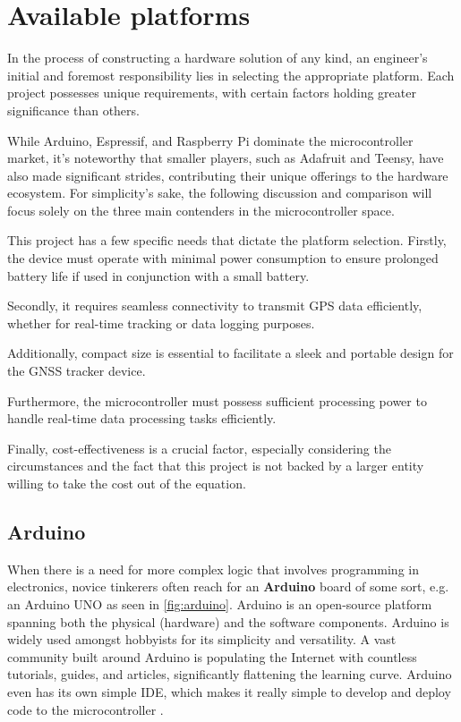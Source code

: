 \documentclass[FM,BP,EN,fonts]{tulthesis}
\begin{document}
\section{Available platforms}
\label{sec:platforms}
In the process of constructing a hardware solution of any kind, an engineer's initial and foremost responsibility lies in selecting the appropriate platform. Each project possesses unique requirements, with certain factors holding greater significance than others. 

While Arduino, Espressif, and Raspberry Pi dominate the microcontroller market, it's noteworthy that smaller players, such as Adafruit and Teensy, have also made significant strides, contributing their unique offerings to the hardware ecosystem. For simplicity's sake, the following discussion and comparison will focus solely on the three main contenders in the microcontroller space.

This project has a few specific needs that dictate the platform selection. Firstly, the device must operate with minimal power consumption to ensure prolonged battery life if used in conjunction with a small battery. 

Secondly, it requires seamless connectivity to transmit GPS data efficiently, whether for real-time tracking or data logging purposes. 

Additionally, compact size is essential to facilitate a sleek and portable design for the GNSS tracker device. 

Furthermore, the microcontroller must possess sufficient processing power to handle real-time data processing tasks efficiently. 

Finally, cost-effectiveness is a crucial factor, especially considering the circumstances and the fact that this project is not backed by a larger entity willing to take the cost out of the equation.

\subsection{Arduino}
When there is a need for more complex logic that involves programming in electronics, novice tinkerers often reach for an \textbf{Arduino} board of some sort, e.g. an Arduino UNO as seen in \autoref{fig:arduino}. Arduino is an open-source platform spanning both the physical (hardware) and the software components. Arduino is widely used amongst hobbyists for its simplicity and versatility. A vast community built around Arduino is populating the Internet with countless tutorials, guides, and articles, significantly flattening the learning curve. Arduino even has its own simple IDE, which makes it really simple to develop and deploy code to the microcontroller \cite{what-is-arduino}.
\end{document}

